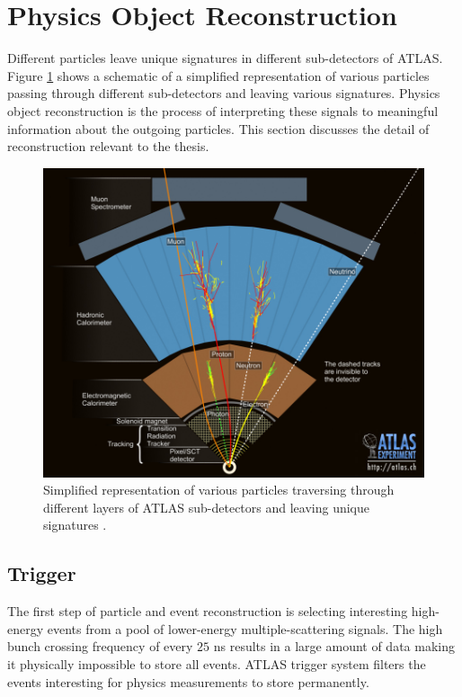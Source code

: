 \section{ Physics Object Reconstruction} 
\label{sec:ParticleReconstruction}
Different particles leave unique signatures in different sub-detectors of ATLAS. Figure \ref{fig:ATLASTransverse} shows a schematic of a simplified representation of various particles passing through different sub-detectors and leaving various signatures. Physics object reconstruction is the process of interpreting these signals to meaningful information about the outgoing particles. This section discusses the detail of reconstruction relevant to the thesis. 

\begin{figure}[!htb]
    \centering
    \includegraphics[width=.98\linewidth]{figures/LHC/ATLAS_Transverse.jpg}
    \caption{ Simplified representation of various particles traversing through different layers of ATLAS sub-detectors and leaving unique signatures \cite{ATLASTransverse}.\label{fig:ATLASTransverse}}
\end{figure}

\subsection{Trigger}
\label{subsec:TriggerATLAS}
The first step of particle and event reconstruction is selecting interesting high-energy events from a pool of lower-energy multiple-scattering signals. The high bunch crossing frequency of every $25$ ns results in a large amount of data making it physically impossible to store all events. ATLAS trigger system filters the events interesting for physics measurements to store permanently. 

